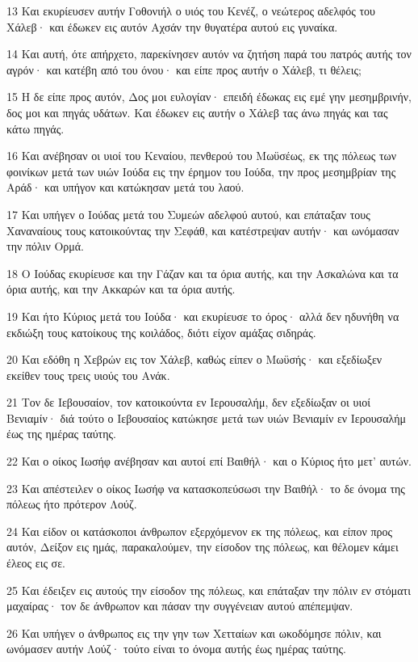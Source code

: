 \par 13 Και εκυρίευσεν αυτήν Γοθονιήλ ο υιός του Κενέζ, ο νεώτερος αδελφός του Χάλεβ· και έδωκεν εις αυτόν Αχσάν την θυγατέρα αυτού εις γυναίκα.
\par 14 Και αυτή, ότε απήρχετο, παρεκίνησεν αυτόν να ζητήση παρά του πατρός αυτής τον αγρόν· και κατέβη από του όνου· και είπε προς αυτήν ο Χάλεβ, τι θέλεις;
\par 15 Η δε είπε προς αυτόν, Δος μοι ευλογίαν· επειδή έδωκας εις εμέ γην μεσημβρινήν, δος μοι και πηγάς υδάτων. Και έδωκεν εις αυτήν ο Χάλεβ τας άνω πηγάς και τας κάτω πηγάς.
\par 16 Και ανέβησαν οι υιοί του Κεναίου, πενθερού του Μωϋσέως, εκ της πόλεως των φοινίκων μετά των υιών Ιούδα εις την έρημον του Ιούδα, την προς μεσημβρίαν της Αράδ· και υπήγον και κατώκησαν μετά του λαού.
\par 17 Και υπήγεν ο Ιούδας μετά του Συμεών αδελφού αυτού, και επάταξαν τους Χαναναίους τους κατοικούντας την Σεφάθ, και κατέστρεψαν αυτήν· και ωνόμασαν την πόλιν Ορμά.
\par 18 Ο Ιούδας εκυρίευσε και την Γάζαν και τα όρια αυτής, και την Ασκαλώνα και τα όρια αυτής, και την Ακκαρών και τα όρια αυτής.
\par 19 Και ήτο Κύριος μετά του Ιούδα· και εκυρίευσε το όρος· αλλά δεν ηδυνήθη να εκδιώξη τους κατοίκους της κοιλάδος, διότι είχον αμάξας σιδηράς.
\par 20 Και εδόθη η Χεβρών εις τον Χάλεβ, καθώς είπεν ο Μωϋσής· και εξεδίωξεν εκείθεν τους τρεις υιούς του Ανάκ.
\par 21 Τον δε Ιεβουσαίον, τον κατοικούντα εν Ιερουσαλήμ, δεν εξεδίωξαν οι υιοί Βενιαμίν· διά τούτο ο Ιεβουσαίος κατώκησε μετά των υιών Βενιαμίν εν Ιερουσαλήμ έως της ημέρας ταύτης.
\par 22 Και ο οίκος Ιωσήφ ανέβησαν και αυτοί επί Βαιθήλ· και ο Κύριος ήτο μετ' αυτών.
\par 23 Και απέστειλεν ο οίκος Ιωσήφ να κατασκοπεύσωσι την Βαιθήλ· το δε όνομα της πόλεως ήτο πρότερον Λούζ.
\par 24 Και είδον οι κατάσκοποι άνθρωπον εξερχόμενον εκ της πόλεως, και είπον προς αυτόν, Δείξον εις ημάς, παρακαλούμεν, την είσοδον της πόλεως, και θέλομεν κάμει έλεος εις σε.
\par 25 Και έδειξεν εις αυτούς την είσοδον της πόλεως, και επάταξαν την πόλιν εν στόματι μαχαίρας· τον δε άνθρωπον και πάσαν την συγγένειαν αυτού απέπεμψαν.
\par 26 Και υπήγεν ο άνθρωπος εις την γην των Χετταίων και ωκοδόμησε πόλιν, και ωνόμασεν αυτήν Λούζ· τούτο είναι το όνομα αυτής έως ημέρας ταύτης.
